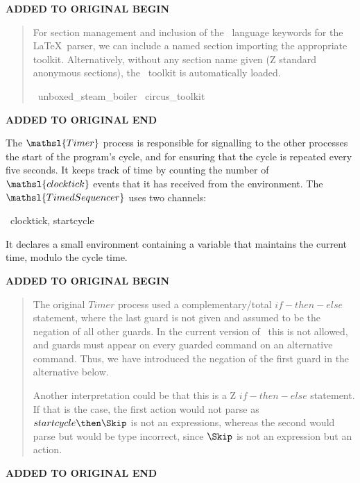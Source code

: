 \documentclass{report}
\newcommand{\event}[1]{\mathsl{#1}}
\newenvironment{addedstuff}{\begin{flushleft}\textbf{ADDED TO ORIGINAL BEGIN}\begin{quote}\begin{minipage}{.8\textwidth}}{\end{minipage}\end{quote}\textbf{ADDED TO ORIGINAL END}\end{flushleft}}
\begin{document}
\begin{addedstuff}
For section management and inclusion of the \Circus\ language keywords
for the \LaTeX\ parser, we can include a named section importing the
appropriate toolkit. Alternatively, without any section name given (Z
standard anonymous sections), the \Circus\ toolkit is automatically loaded.
%
\begin{zsection}
  \SECTION\ unboxed\_steam\_boiler \parents\ circus\_toolkit
\end{zsection}
\end{addedstuff}

The \( \mathsl{Timer} \)\/ process is responsible for signalling to
the other processes the start of the program's cycle, and for ensuring
that the cycle is repeated every five seconds.  It keeps track of time
by counting the number of \( \event{clocktick} \)\/ events that it has
received from the environment.  The \( \mathsl{TimedSequencer} \)\/
uses two channels:
\begin{circus}
    \circchannel\ clocktick, startcycle
\end{circus}

It declares a small environment containing a variable that maintains
the current time, modulo the cycle time.

\begin{addedstuff}
   The original $Timer$ process used a complementary/total $if-then-else$ statement,
   where the last guard is not given and assumed to be the negation of all other guards.
   In the current version of \Circus\ this is not allowed, and guards must appear on every guarded command
   on an alternative command. Thus, we have introduced the negation of the first guard in the alternative below.

   Another interpretation could be that this is a Z $if-then-else$ statement. If that is the
   case, the first action would not parse as $startcycle \then \Skip$ is not an expressions,
   whereas the second would parse but would be type incorrect, since $\Skip$ is not an
   expression but an action.
\end{addedstuff}
\end{document}
